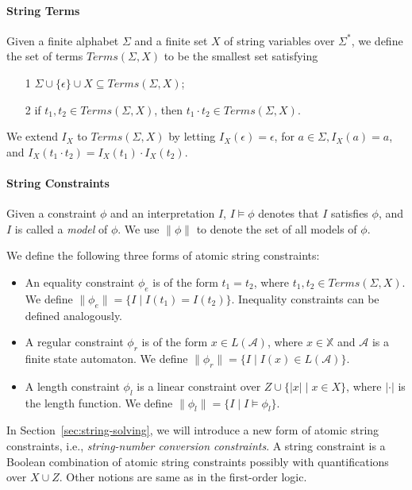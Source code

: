 \documentclass[runningheads]{llncs}
\begin{document}
\paragraph{String Terms}
Given a finite alphabet $\Sigma$ and 
a finite set $X$ of string variables over $\Sigma^*$,
we define the set of terms $\textit{Terms}(\Sigma,X)$ 
to be the smallest set satisfying
\begin{itemize}
    \item[1] $\Sigma\cup \{\epsilon\} \cup X \subseteq \textit{Terms}(\Sigma,X)$;
    \item[2] if $t_1,t_2\in \textit{Terms}(\Sigma,X)$, then $t_1 \cdot t_2 \in \textit{Terms}(\Sigma,X)$.
\end{itemize} 

We extend $I_X$ to $\textit{Terms}(\Sigma,X)$ by letting $I_X(\epsilon)=\epsilon$, 
for $a\in \Sigma, I_X(a)=a$,
and $I_X(t_1\cdot t_2)= I_X(t_1)\cdot I_X(t_2)$.

\paragraph{String Constraints} \label{par: string constraints}
Given a constraint $\phi$ and an interpretation $I$,
$I\models \phi$ denotes that $I$ satisfies $\phi$,
and $I$ is called a \emph{model} of $\phi$.
We use $\lVert \phi\rVert$ to denote the set of all models of $\phi$.

We define the following three forms of atomic string constraints:
\begin{itemize}
\item An equality constraint $\phi_e$ is of the form 
$t_1 = t_2$, where $t_1,t_2\in \textit{Terms}(\Sigma,X)$.
We define $\lVert \phi_e \rVert = \{I\mid I(t_1)=I(t_2)\}$.
Inequality constraints can be defined analogously.

\item A regular constraint $\phi_r$ is of the form 
$x\in L(\mathcal{A})$,
where $x\in \mathbb{X}$ and $\mathcal{A}$ is a finite state automaton.
We define $\lVert \phi_r \rVert = \{I\mid I(x)\in L(\mathcal{A})\}$.

\item A length constraint $\phi_l$ is a linear constraint over 
$Z \cup \{|x| \mid x\in X\}$, %
where $|\cdot |$ is the length function.
We define $\lVert \phi_l \rVert = \{I \mid I\models \phi_l \}$.
\end{itemize}

In Section~\ref{sec:string-solving},  
we will introduce a new form of atomic string constraints, i.e., \emph{string-number conversion constraints}.
A string constraint is a Boolean combination of atomic string constraints possibly with quantifications over $X\cup Z$. Other notions are same as in the first-order logic. 
\end{document}

